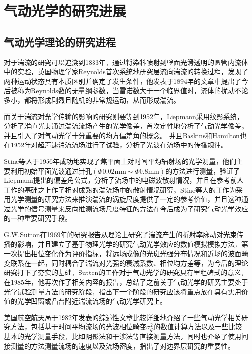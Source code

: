 \section{气动光学的研究进展}
\subsection{气动光学理论的研究进程}
对于湍流的研究可以追溯到1883年，通过将染料喷射到壁面光滑透明的圆管内流体中的实验，英国物理学家Reynolds首次系统地研究层流向湍流的转换过程，发现了两种运动状态具有本质区别并确定了发生条件，他发表于1894年的文章中提出了今后被称为Reynolds数的无量纲参数，当雷诺数大于一个临界值时，流体的扰动不论多小，都将形成剧烈且随机的非常规运动，从而形成湍流\cite{renolds1894}。

而关于湍流对光学传输的影响的研究则要等到1952年，Liepmann采用纹影系统，分析了准直光束通过湍流流场产生的光学像差，首次定性地分析了气动光学像差，并且引入了对气动光学十分重要的均方偏差角的概念\cite{liepman1952}。
并且Baskins和Hamilton也在1952年对超声速湍流流场进行了试验，分析了光波在流场中的传播规律\cite{baskins1952}。

Stine等人于1956年成功地实现了焦平面上对时间平均辐射场的光学测量，他们主要利用初始平面光波通过针孔$(\Phi0.02\text{mm}\sim\Phi0.8\text{mm})$的方法进行测量\cite{stine1956}，验证了Liepmann提出的偏差角公式，分析了流场中的电磁波散射情况，并且在参考前人工作的基础之上作了相对成熟的湍流场中的散射情况研究\cite{tatarski1961,villars1954,booker1950}，Stine等人的工作为采用光学测量的研究方法来推演湍流的涡旋尺度提供了一定的参考价值，并且这种通过光学的信号测量来反向推测流场尺度特征的方法在今后成为了研究气动光学效应的一种重要研究手段。
 
G.W.Sutton在1969年的研究报告从理论上研究了湍流产生的折射率脉动对光束传播的影响，并且建立了基于物理光学的研究气动光学效应的数值模拟模拟方法，第一次提出相位变化作为评价指标，将远场成像的光斑光强分布情况和近场的波面畸变联系在一起，同时耦合了湍流对光强的衰减系数、相位均方差等，为今后的理论研究打下了夯实的基础\cite{sutton1969}，Sutton的工作对于气动光学的研究具有里程碑式的意义，在1985年，他再次作了相关内容的报告，总结了之前关于气动光学的研究主要处于光学试验测量方法的研究阶段，指出下一个阶段的研究应该将重点放在具有实用价值的光学凹窗或凸台附近湍流流场的气动光学研究上\cite{sutton1985}。
 
美国航空航天局于1982年发表的综述\cite{gilbert1982}性文章比较详细地介绍了一些气动光学相关研究方法，包括基于时间平均流场的光波相位畸变$\sigma^2_\Phi$的数值计算方法以及一些比较基本的光学测量手段，比如阴影法和干涉法等直接测量方法，同时也介绍了使用间接测量的方法测量流场的速度以及流场密度，指出了对边界层研究的重要性\cite{trollinger1982}。

